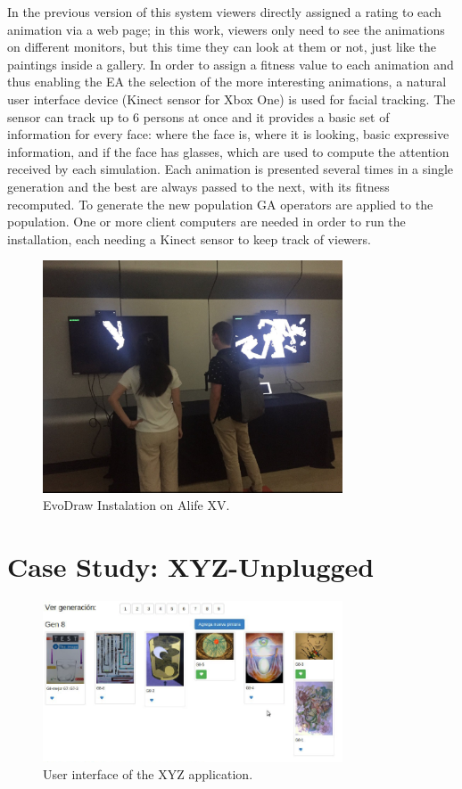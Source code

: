 In the previous version of this system \citep{garcia2013evospace} 
viewers directly assigned a rating to each animation via a web page; in this work, viewers
only need to see the animations on different monitors, but this time they can look at them 
or not, just like the paintings inside a gallery. In order to assign a fitness value to 
each animation and thus  enabling the EA the selection of the more interesting animations, 
a natural user interface device (Kinect sensor for Xbox One)
is used for facial tracking. The sensor can track up to 6 persons at once and  
it provides a basic set of information for every face: where the face is, where it is looking, 
basic expressive information, and if the face has glasses, which are used to compute the
attention received by each simulation. Each animation is 
presented several times in a single generation and the best are always passed to the next, 
with its fitness recomputed. To generate the new population GA operators
are applied to the population. One or more client computers are needed in order to run the 
installation, each needing a Kinect sensor to keep track of viewers. 

\begin{figure}[!t]
    \centering
        \includegraphics[width=3.5in]{img/kinect.png}
    \caption{EvoDraw Instalation on Alife XV.}
    \label{fig:kinect}
\end{figure}


\section{Case Study: XYZ-Unplugged}
\begin{figure}[!t]
    \centering
        \includegraphics[width=3.5in]{img/interfaceXYZ.png}
    \caption{User interface of the XYZ application.}
    \label{fig:xyz}
\end{figure}


